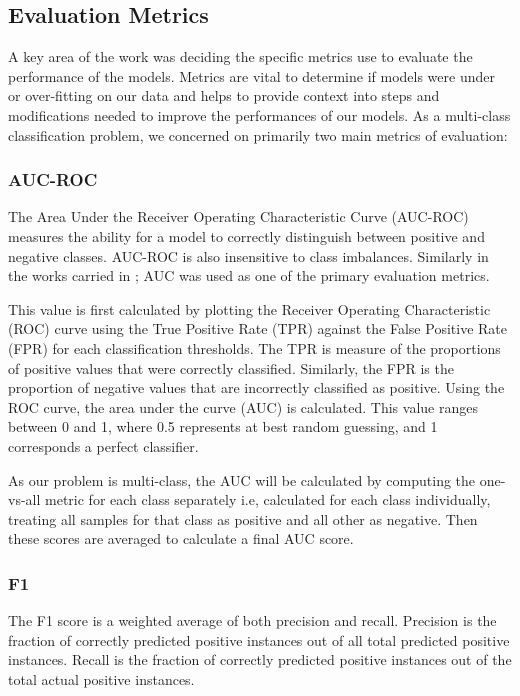 \subsection{Evaluation Metrics}

A key area of the work was deciding the specific metrics use to evaluate the performance of the models. Metrics are vital to determine if models were under or over-fitting on our data and helps to provide context into steps and modifications needed to improve the performances of our models. 
As a multi-class classification problem, we concerned on primarily two main metrics of evaluation: 


\subsubsection*{AUC-ROC}

The Area Under the Receiver Operating Characteristic Curve (AUC-ROC) measures the ability for a model to correctly distinguish between positive and negative classes. AUC-ROC is also insensitive to class imbalances. Similarly in the works carried in \parencite{s22155633};\parencite{pick_quality_over} AUC was used as one of the primary evaluation metrics.

\medskip

This value is first calculated by plotting the Receiver Operating Characteristic (ROC) curve using the True Positive Rate (TPR) against the False Positive Rate (FPR) for each classification thresholds. The TPR is measure of the proportions of positive values that were correctly classified. Similarly, the FPR is the proportion of negative values that are incorrectly classified as positive. Using the ROC curve, the area under the curve (AUC) is calculated. This value ranges between 0 and 1, where 0.5 represents at best random guessing, and 1 corresponds a perfect classifier.

\medskip

As our problem is multi-class, the AUC will be calculated by computing the one-vs-all metric for each class separately i.e,  calculated for each class individually, treating all samples for that class as positive and all other as negative. Then these scores are averaged to calculate a final AUC score.

\subsubsection*{F1}

The F1 score is a weighted average of both precision and recall. Precision is the fraction of correctly predicted positive instances out of all total predicted positive instances. Recall is the fraction of correctly predicted positive instances out of the total actual positive instances.

